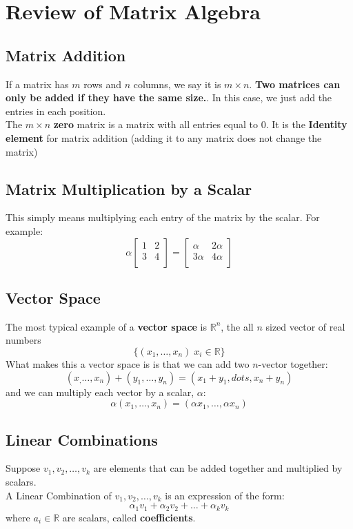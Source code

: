 \documentclass[a4paper, 9pt]{extarticle}
\begin{document}
\pagebreak
\footnotesize
\tableofcontents
\pagebreak
\normalsize
\section{Review of Matrix Algebra}
\subsection*{Matrix Addition}
If a matrix has $m$ rows and $n$ columns, we say it is $m \times n$. \textbf{Two matrices can only be added if they have the same size.}. In this case, we just add the entries in each position. \\[1.5ex]
The $m \times n$ \textbf{zero} matrix is a matrix with all entries equal to $0$. It is the \textbf{Identity element} for matrix addition (adding it to any matrix does not change the matrix)
\subsection*{Matrix Multiplication by a Scalar}
This simply means multiplying each entry of the matrix by the scalar. For example:
$$
  \alpha \begin{bmatrix}
    1 & 2 \\
    3 & 4 \\
  \end{bmatrix}
  =
  \begin{bmatrix}
    \alpha  & 2\alpha \\
    3\alpha & 4\alpha \\
  \end{bmatrix}
$$
\subsection*{Vector Space}
\begin{definitionbox}{}{}
  The most typical example of a \textbf{vector space} is $\mathbb{R}^n$, the all $n$ sized vector of real numbers
  $$\{(x_1, \dots, x_n)\; x_i \in \mathbb{R}\}$$
  What makes this a vector space is is that we can add two $n$-vector together:
  $$(x_, \dots, x_n) + (y_1, \dots, y_n) = (x_1 + y_1, dots, x_n + y_n)$$
  and we can multiply each vector by a scalar, $\alpha$:
  $$
    \alpha (x_1, \dots, x_n) = (\alpha x_1, \dots, \alpha x_n)
  $$
\end{definitionbox}

\subsection*{Linear Combinations}
Suppose $v_1, v_2, \dots, v_k$ are elements that can be added together and multiplied by scalars. \\[2ex]
A Linear Combination of $v_1, v_2, \dots, v_k$ is an expression of the form:
$$
  \alpha_1 v_1 + \alpha_2 v_2 + \ldots + \alpha_k v_k
$$
where $a_i \in \mathbb{R}$ are scalars, called \textbf{coefficients}.
\end{document}
